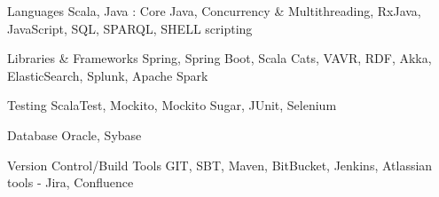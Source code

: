 
\begin{cvskills}
  \cvskill
    {Languages} %
    {Scala, Java : Core Java, Concurrency \& Multithreading, RxJava, JavaScript, SQL, SPARQL, SHELL scripting } %

  \cvskill
    {Libraries \& Frameworks} %
    {Spring, Spring Boot, Scala Cats, VAVR, RDF, Akka, ElasticSearch, Splunk, Apache Spark} %

  \cvskill
    {Testing} %
    {ScalaTest, Mockito, Mockito Sugar, JUnit, Selenium} %

  \cvskill
    {Database} %
    {Oracle, Sybase} %

  \cvskill
    {Version Control/Build Tools} %
    {GIT, SBT, Maven, BitBucket, Jenkins, Atlassian tools - Jira, Confluence} %
\end{cvskills}
